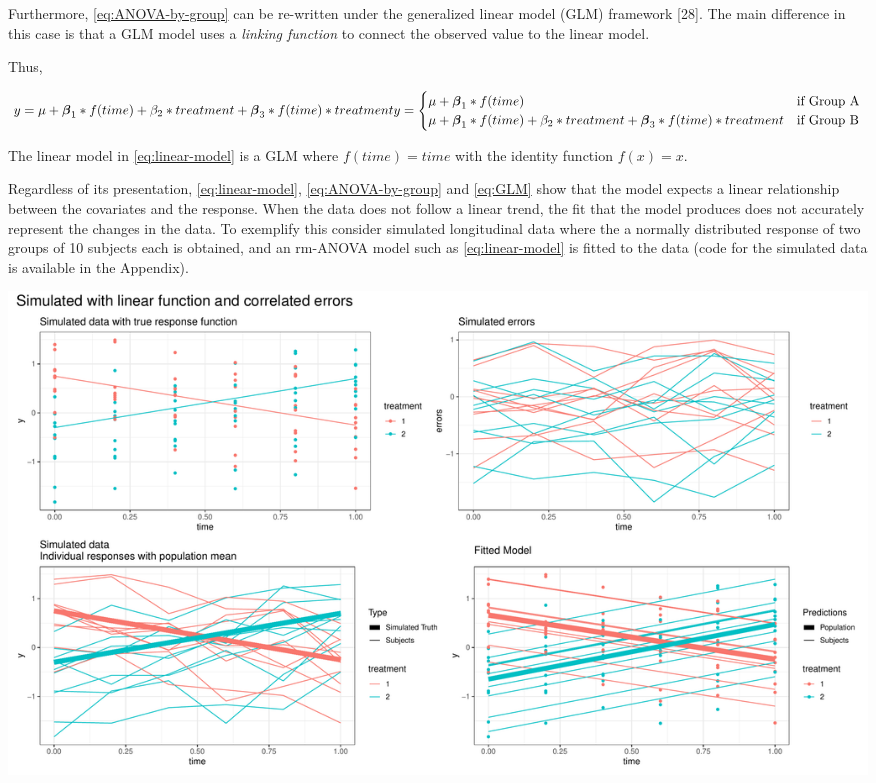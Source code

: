 \documentclass[
]{article}
\begin{document}
Furthermore, \eqref{eq:ANOVA-by-group} can be re-written under the generalized linear model (GLM) framework {[}28{]}. The main difference in this case is that a GLM model uses a \emph{linking function} to connect the observed value to the linear model.

Thus,

\begin{equation}
  y =\mu +\boldsymbol{\beta}_1* f(time) + \beta_2* treatment+\boldsymbol{\beta}_3*             f(time)*treatment \\

  y = \begin{cases}
  \mu +\boldsymbol{\beta}_1* f(time)  & \mbox{if Group A} \\
  \mu +\boldsymbol{\beta}_1* f(time)  + \beta_2* treatment + \boldsymbol{\beta}_3* f(time) *     treatment   & \mbox{if Group B}\\
  \end{cases}
  \label{eq:GLM}
\end{equation}

The linear model in \eqref{eq:linear-model} is a GLM where \(f(time) = time\) with the identity function \(f(x) = x\).

Regardless of its presentation, \eqref{eq:linear-model}, \eqref{eq:ANOVA-by-group} and \eqref{eq:GLM} show that the model expects a linear relationship between the covariates and the response. When the data does not follow a linear trend, the fit that the model produces does not accurately represent the changes in the data. To exemplify this consider simulated longitudinal data where the a normally distributed response of two groups of 10 subjects each is obtained, and an rm-ANOVA model such as \eqref{eq:linear-model} is fitted to the data (code for the simulated data is available in the Appendix).

\includegraphics[width=1\linewidth]{Manuscript_AM_v1_files/figure-latex/unnamed-chunk-3-1}
\end{document}
